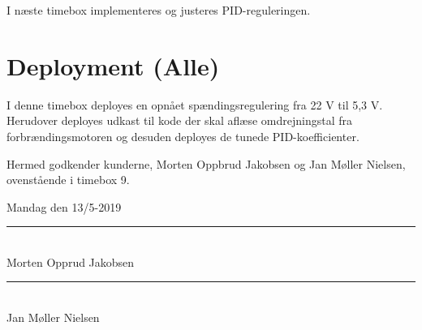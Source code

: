 I næste timebox implementeres og justeres PID-reguleringen.
\clearpage
\section{Deployment (Alle)}
\label{sec:deployment}

I denne timebox deployes en opnået spændingsregulering fra 22 V til 5,3 V. Herudover deployes udkast til kode der skal aflæse omdrejningstal fra forbrændingsmotoren og desuden deployes de tunede PID-koefficienter.

Hermed godkender kunderne, Morten Oppbrud Jakobsen og Jan Møller Nielsen, ovenstående i timebox 9.

Mandag den 13/5-2019

\begin{minipage}{.5\textwidth}
  \begin{center}
    \vspace{1.4cm}
    \rule{0.8\textwidth}{0.1pt}\\
    \small{Morten Opprud Jakobsen\\%
    }
  \end{center}
\end{minipage}%
\begin{minipage}{0.5\textwidth}
  \begin{center}
    \vspace{1.4cm}
    \rule{0.8\textwidth}{0.1pt}\\
    \small{Jan Møller Nielsen\\%
    }
  \end{center}
\end{minipage}

